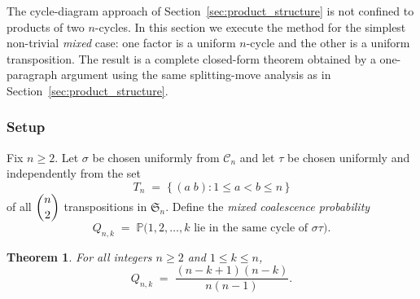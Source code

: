 \documentclass[12pt,a4paper]{article}
\newtheorem{theorem}{Theorem}[section]
\theoremstyle{definition}
\newcommand{\Sn}{\mathfrak{S}_n}
\newcommand{\Cn}{\mathcal{C}_n}
\newcommand{\Prob}{\mathbb{P}}
\renewcommand{\binom}[2]{\dbinom{#1}{#2}}
\begin{document}
The cycle-diagram approach of Section~\ref{sec:product_structure} is not
confined to products of two $n$-cycles.  In this section we execute the
method for the simplest non-trivial \emph{mixed} case: one factor is a
uniform $n$-cycle and the other is a uniform transposition.  The result
is a complete closed-form theorem obtained by a one-paragraph argument
using the same splitting-move analysis as in Section~\ref{sec:product_structure}.

\subsubsection*{Setup}

Fix $n\ge 2$.  Let $\sigma$ be chosen uniformly from $\Cn$ and let $\tau$
be chosen uniformly and independently from the set
\[
T_n \;=\; \bigl\{\,(a\;b) : 1\le a < b \le n\,\bigr\}
\]
of all $\binom{n}{2}$ transpositions in $\Sn$.  Define the
\emph{mixed coalescence probability}
\[
Q_{n,k} \;=\; \Prob\!\bigl(1,2,\dots,k \text{ lie in the same cycle of }
\sigma\tau\bigr).
\]

\begin{theorem}
\label{thm:transposition}
For all integers $n\ge 2$ and $1\le k\le n$,
\[
Q_{n,k}
\;=\;
\frac{(n-k+1)(n-k)}{n(n-1)}.
\tag{$\star\!\star$}
\]
\end{theorem}
\end{document}
